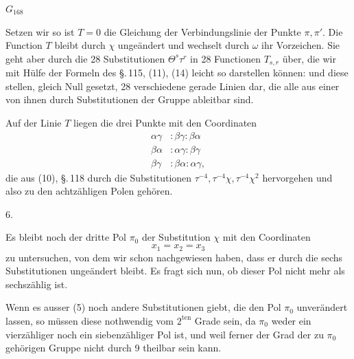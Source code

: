  $G_{168}$ 

Setzen wir
so ist $T = 0$ die Gleichung der Verbindungslinie der Punkte $\pi, \pi'$. Die Function $T$ bleibt durch $\chi$ ungeändert und wechselt durch $\omega$ ihr Vorzeichen. Sie geht aber durch die 28 Substitutionen $\Theta^s\tau^r$ in 28  Functionen $T_{s,r}$ über, die wir mit Hülfe der Formeln des \S.\,115, (11), (14) leicht so darstellen können:
und diese stellen, gleich Null gesetzt, 28 verschiedene gerade Linien dar, die alle aus einer von ihnen durch Substitutionen der Gruppe ableitbar sind.

Auf der Linie $T$ liegen die drei Punkte mit den Coordinaten
\[
\begin{aligned}
\alpha\gamma &: \beta\gamma : \beta\alpha \\
\beta\alpha &: \alpha\gamma : \beta\gamma \\
\beta\gamma &: \beta\alpha : \alpha\gamma,
\end{aligned}
\]
die aus (10), \S.\,118 durch die Substitutionen $\tau^{-4}, \tau^{-4}\chi, \tau^{-4}\chi^2$ hervorgehen und also zu den achtzähligen Polen gehören.

6. 

Es bleibt noch der dritte Pol $\pi_0$ der Substitution $\chi$ mit den Coordinaten
\[
x_1 = x_2 = x_3
\]
zu untersuchen, von dem wir schon nachgewiesen haben, dass er durch die sechs Substitutionen
ungeändert bleibt. Es fragt sich nun, ob dieser Pol nicht mehr als sechszählig ist.

Wenn es ausser (5) noch andere Substitutionen giebt, die den Pol $\pi_0$ unverändert lassen, so müssen diese nothwendig vom $2^{\mathrm{ten}}$ Grade sein, da $\pi_0$ weder ein vierzähliger noch ein siebenzähliger Pol ist, und weil ferner der Grad der zu $\pi_0$ gehörigen Gruppe nicht durch 9 theilbar sein kann.
